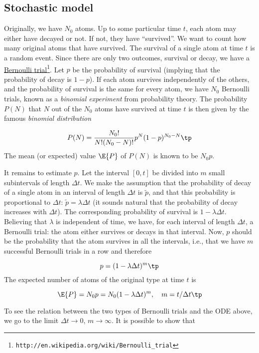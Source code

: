 \documentclass[graybox,sectrefs,envcountresetchap,open=right,final]{svmonodo}
\begin{document}
\subsection{Stochastic model}

Originally, we have $N_0$ atoms. Up to some particular time $t$, each
atom may either have decayed or not. If not, they have ``survived''.
We want to count how many original
atoms that have survived.
The survival of a single atom at time $t$ is a random event. Since there
are only two outcomes, survival or decay, we have a
\href{{http://en.wikipedia.org/wiki/Bernoulli_trial}}{Bernoulli trial}\footnote{\texttt{http://en.wikipedia.org/wiki/Bernoulli\_trial}}.
Let $p$ be the
probability of survival (implying that the probability of decay
is $1-p$). If each atom survives independently of
the others, and the probability of survival is the same for every
atom, we have $N_0$ Bernoulli trials, known as
a \emph{binomial experiment} from probability theory.
The probability $P(N)$ that $N$ out
of the $N_0$ atoms have survived at time $t$ is then given by the
famous \emph{binomial distribution}

\[ P(N) = \frac{N_0!}{N! (N_0-N)!}p^N (1-p)^{N_0-N}\tp \]
The mean (or expected) value $\E{P}$ of $P(N)$ is known to be $N_0p$.

It remains to estimate $p$. Let the interval $[0,t]$ be divided into $m$
small subintervals of length $\Delta t$. We make the assumption that
the probability of decay of a single atom in an interval of length $\Delta t$
is $\tilde p$, and that this probability is proportional to $\Delta t$:
$\tilde p = \lambda\Delta t$ (it sounds natural that the probability
of decay increases with $\Delta t$). The corresponding probability of survival
is $1-\lambda\Delta t$. Believing that $\lambda$ is independent
of time, we have, for each interval of length $\Delta t$,
a Bernoulli trial: the atom either survives or
decays in that interval. Now, $p$ should be the probability that the atom
survives in all the intervals, i.e., that we have $m$ successful
Bernoulli trials in a row and therefore

\[ p = (1-\lambda\Delta t)^m\tp\]
The expected number of atoms of the original type at time $t$ is

\begin{equation}
\E{P} = N_0p = N_0(1-\lambda\Delta t)^m,\quad m=t/\Delta t\tp
\end{equation}

To see the relation between the two types of Bernoulli trials and the
ODE above, we go to the limit $\Delta t\rightarrow 0$, $m\rightarrow\infty$.
It is possible to show that
\end{document}
